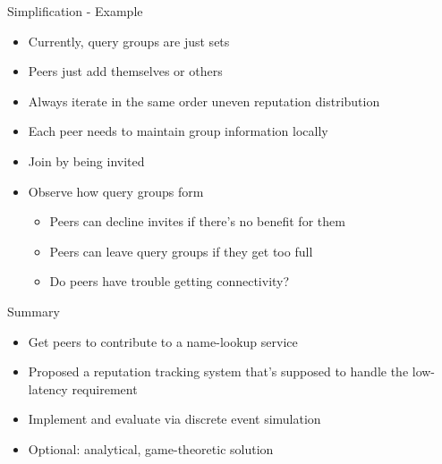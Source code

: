 \documentclass[presentation,english,usenames,dvipsnames]{beamer}
\begin{document}
\begin{frame}{Simplification - Example}
  \begin{itemize}
    \item Currently, query groups are just sets
    \item Peers just add themselves or others
    \item Always iterate in the same order \rightarrow uneven reputation
          distribution
    \item Each peer needs to maintain group information locally
    \item Join by being invited
    \item Observe how query groups form
    \begin{itemize}
      \item Peers can decline invites if there's no benefit for them
      \item Peers can leave query groups if they get too full
      \item Do peers have trouble getting connectivity?
    \end{itemize}
  \end{itemize}
\end{frame}

\begin{frame}{Summary}
  \begin{itemize}
    \item Get peers to contribute to a name-lookup service
    \item Proposed a reputation tracking system that's supposed to handle the
          low-latency requirement
    \item Implement and evaluate via discrete event simulation
    \item Optional: analytical, game-theoretic solution
  \end{itemize}
\end{frame}

\begin{frame}
\end{frame}
\end{document}
